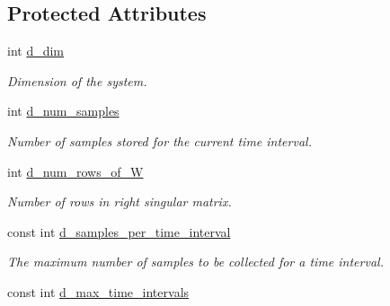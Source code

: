 \subsection*{Protected Attributes}
\begin{DoxyCompactItemize}
\item 
\hypertarget{class_c_a_r_o_m_1_1_s_v_d_a1d34488c53c5699e51a5cef65a6caa9f}{int \hyperlink{class_c_a_r_o_m_1_1_s_v_d_a1d34488c53c5699e51a5cef65a6caa9f}{d\-\_\-dim}}\label{class_c_a_r_o_m_1_1_s_v_d_a1d34488c53c5699e51a5cef65a6caa9f}

\begin{DoxyCompactList}\small\item\em Dimension of the system. \end{DoxyCompactList}\item 
\hypertarget{class_c_a_r_o_m_1_1_s_v_d_a8ab3384bad0f105ccafeaca9015a96ee}{int \hyperlink{class_c_a_r_o_m_1_1_s_v_d_a8ab3384bad0f105ccafeaca9015a96ee}{d\-\_\-num\-\_\-samples}}\label{class_c_a_r_o_m_1_1_s_v_d_a8ab3384bad0f105ccafeaca9015a96ee}

\begin{DoxyCompactList}\small\item\em Number of samples stored for the current time interval. \end{DoxyCompactList}\item 
\hypertarget{class_c_a_r_o_m_1_1_s_v_d_a2336df07a9c7a9ae7d9ba070f7f8635a}{int \hyperlink{class_c_a_r_o_m_1_1_s_v_d_a2336df07a9c7a9ae7d9ba070f7f8635a}{d\-\_\-num\-\_\-rows\-\_\-of\-\_\-\-W}}\label{class_c_a_r_o_m_1_1_s_v_d_a2336df07a9c7a9ae7d9ba070f7f8635a}

\begin{DoxyCompactList}\small\item\em Number of rows in right singular matrix. \end{DoxyCompactList}\item 
\hypertarget{class_c_a_r_o_m_1_1_s_v_d_a51f01271f0c3bd30eb34bd50fbbcf23d}{const int \hyperlink{class_c_a_r_o_m_1_1_s_v_d_a51f01271f0c3bd30eb34bd50fbbcf23d}{d\-\_\-samples\-\_\-per\-\_\-time\-\_\-interval}}\label{class_c_a_r_o_m_1_1_s_v_d_a51f01271f0c3bd30eb34bd50fbbcf23d}

\begin{DoxyCompactList}\small\item\em The maximum number of samples to be collected for a time interval. \end{DoxyCompactList}\item 
\hypertarget{class_c_a_r_o_m_1_1_s_v_d_a102150ef1b4d72af0c43f1204a9b668a}{const int \hyperlink{class_c_a_r_o_m_1_1_s_v_d_a102150ef1b4d72af0c43f1204a9b668a}{d\-\_\-max\-\_\-time\-\_\-intervals}}\label{class_c_a_r_o_m_1_1_s_v_d_a102150ef1b4d72af0c43f1204a9b668a}


\end{DoxyCompactItemize}
